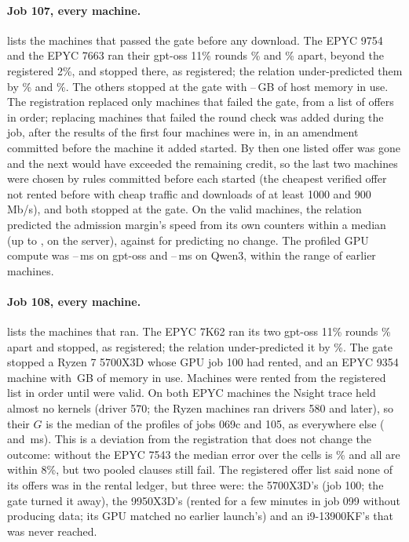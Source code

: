 

\paragraph{Job 107, every machine.}  lists the \jlRanWord{} machines that passed the gate before any
download. The EPYC 9754 and the EPYC 7663 ran their gpt-oss 11\% rounds \jlSpreadc\% and \jlSpreade\% apart, beyond the
registered 2\%, and stopped there, as registered; the relation under-predicted them by \jlErrGc\% and \jlErrGe\%. The
others stopped at the gate with \jlUsedGateMin--\jlUsedGateMax\,GB of host memory in use. The registration replaced
only machines that failed the gate, from a list of offers in order; replacing machines that failed the round check was
added during the job, after the results of the first four machines were in, in an amendment committed before the
machine it added started. By then one listed offer was gone
and the next would have exceeded the remaining credit, so the last two machines were chosen by rules committed before
each started (the cheapest verified offer not rented before with cheap traffic and downloads of at least 1000 and
900\,Mb/s), and both stopped at the gate. On the \jlValidWord{} valid machines, the relation predicted the admission
margin's speed from its own counters within a median \jlDkPredMed{} (up to \jlDkPredMax, on the server), against
\jlDkNoChangeMed{} for predicting no change. The profiled GPU compute was \jlGMin--\jlGMax\,ms on gpt-oss and
\jlGQMin--\jlGQMax\,ms on Qwen3, within the range of earlier machines.



\paragraph{Job 108, every machine.}  lists the machines that ran. The EPYC 7K62 ran its two gpt-oss 11\%
rounds \jmInvSpreadMin\% apart and stopped, as registered; the relation under-predicted it by \jmErrbLow\%. The gate
stopped a Ryzen 7 5700X3D whose GPU job 100 had rented, and an EPYC 9354 machine with \jmUsedGateMin\,GB of memory in use.
Machines were rented from the registered list in order until \jmRequiredWord{} were valid. On both EPYC machines the Nsight
trace held almost no kernels (driver 570; the Ryzen machines ran drivers 580 and later), so their $G$ is the median of
the \jmFallbackHosts{} profiles of jobs 069c and 105, as everywhere else (\jmFallbackGLow{} and \jmFallbackGMid\,ms). This is a deviation from the registration that does not change the outcome: without the EPYC 7543 the median error
over the \jmProfOnlyCells{} cells is \jmProfOnlyMed\% and all are within 8\%, but two pooled clauses still fail. The registered offer list said none of its offers was in the rental ledger, but three were: the 5700X3D's (job 100; the gate turned it away), the 9950X3D's (rented for a few minutes in job 099 without producing data; its GPU matched no earlier launch's) and an i9-13900KF's that was never reached.

